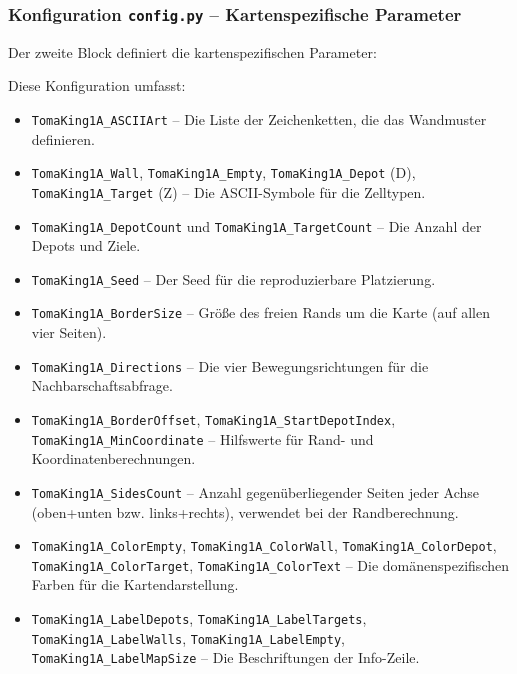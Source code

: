 
\subsubsection{Konfiguration \texttt{config.py} – Kartenspezifische Parameter}

Der zweite Block definiert die kartenspezifischen Parameter:



Diese Konfiguration umfasst:
\begin{itemize}
    \item \texttt{TomaKing1A\_ASCIIArt} – Die Liste der Zeichenketten, die das Wandmuster definieren.
    \item \texttt{TomaKing1A\_Wall}, \texttt{TomaKing1A\_Empty}, \texttt{TomaKing1A\_Depot} (\acs{D}), \texttt{TomaKing1A\_Target} (\acs{Z}) – Die \acs{ASCII}-Symbole für die Zelltypen.
    \item \texttt{TomaKing1A\_DepotCount} und \texttt{TomaKing1A\_TargetCount} – Die Anzahl der Depots und Ziele.
    \item \texttt{TomaKing1A\_Seed} – Der Seed für die reproduzierbare Platzierung.
    \item \texttt{TomaKing1A\_BorderSize} – Größe des freien Rands um die Karte (auf allen vier Seiten).
    \item \texttt{TomaKing1A\_Directions} – Die vier Bewegungsrichtungen für die Nachbarschaftsabfrage.
    \item \texttt{TomaKing1A\_BorderOffset}, \texttt{TomaKing1A\_StartDepotIndex}, \texttt{TomaKing1A\_MinCoordinate} – Hilfswerte für Rand- und Koordinatenberechnungen.
    \item \texttt{TomaKing1A\_SidesCount} – Anzahl gegenüberliegender Seiten jeder Achse (oben+unten bzw. links+rechts), verwendet bei der Randberechnung.
    \item \texttt{TomaKing1A\_ColorEmpty}, \texttt{TomaKing1A\_ColorWall}, \texttt{TomaKing1A\_ColorDepot}, \texttt{TomaKing1A\_ColorTarget}, \texttt{TomaKing1A\_ColorText} – Die domänenspezifischen Farben für die Kartendarstellung.
    \item \texttt{TomaKing1A\_LabelDepots}, \texttt{TomaKing1A\_LabelTargets}, \texttt{TomaKing1A\_LabelWalls}, \texttt{TomaKing1A\_LabelEmpty}, \texttt{TomaKing1A\_LabelMapSize} – Die Beschriftungen der Info-Zeile.

\end{itemize}
